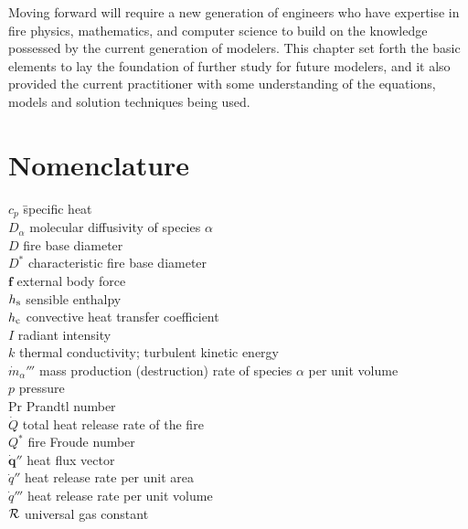 \documentclass[graybox]{svmult}
\begin{document}
Moving forward will require a new generation of engineers who have expertise in fire physics, mathematics, and computer science to build on the knowledge possessed by the current generation of modelers. This chapter set forth the basic elements to lay the foundation of further study for future modelers, and it also provided the current practitioner with some understanding of the equations, models and solution techniques being used.



\section{Nomenclature}

\begin{tabbing}
$c_p$ 	\hspace{1in}     \= specific heat \\
$D_\alpha$	             \> molecular diffusivity of species $\alpha$ \\
$D$                      \> fire base diameter \\
$D^*$                    \> characteristic fire base diameter \\
$\mathbf{f}$	         \> external body force \\
$h_{\rm s}$              \>	sensible enthalpy \\
$h_{\rm c}$ 	         \> convective heat transfer coefficient \\
$I$	                     \> radiant intensity \\
$k$	                     \> thermal	conductivity; turbulent	kinetic energy \\
$\dot{m}_\alpha'''$      \> mass production (destruction) rate of species $\alpha$ per unit volume \\
$p$	                     \> pressure \\
Pr	                     \> Prandtl number \\
$\dot{Q}$                \> total heat release rate of the fire \\
$Q^*$                    \> fire Froude number \\
$\dot{\mathbf{q}}''$	 \> heat flux vector \\
$\dot{q}''$              \> heat release rate per unit area \\
$\dot{q}'''$             \> heat release rate per unit volume \\
$\cal R$                 \> universal gas constant \\

\end{tabbing}
\end{document}
